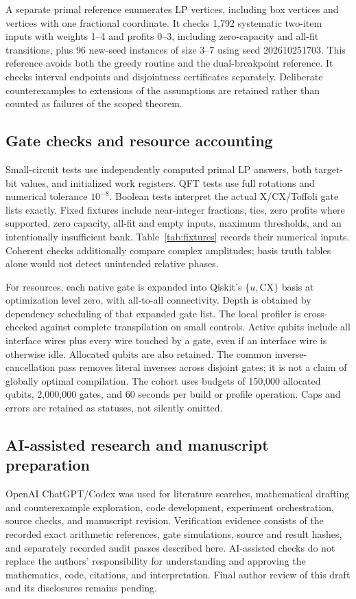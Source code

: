 \documentclass[referee,pdflatex,sn-mathphys-num]{sn-jnl}
\theoremstyle{thmstyleone}
\theoremstyle{thmstyletwo}
\begin{document}
A separate primal reference enumerates LP vertices, including box vertices and vertices with one fractional coordinate. It checks 1,792 systematic two-item inputs with weights 1--4 and profits 0--3, including zero-capacity and all-fit transitions, plus 96 new-seed instances of size 3--7 using seed 202610251703. This reference avoids both the greedy routine and the dual-breakpoint reference. It checks interval endpoints and disjointness certificates separately. Deliberate counterexamples to extensions of the assumptions are retained rather than counted as failures of the scoped theorem.

\subsection{Gate checks and resource accounting}
Small-circuit tests use independently computed primal LP answers, both target-bit values, and initialized work registers. QFT tests use full rotations and numerical tolerance $10^{-8}$. Boolean tests interpret the actual X/CX/Toffoli gate lists exactly. Fixed fixtures include near-integer fractions, ties, zero profits where supported, zero capacity, all-fit and empty inputs, maximum thresholds, and an intentionally insufficient bank. Table~\ref{tab:fixtures} records their numerical inputs. Coherent checks additionally compare complex amplitudes; basis truth tables alone would not detect unintended relative phases.

For resources, each native gate is expanded into Qiskit's $\{u,\mathrm{CX}\}$ basis at optimization level zero, with all-to-all connectivity. Depth is obtained by dependency scheduling of that expanded gate list. The local profiler is cross-checked against complete transpilation on small controls. Active qubits include all interface wires plus every wire touched by a gate, even if an interface wire is otherwise idle. Allocated qubits are also retained. The common inverse-cancellation pass removes literal inverses across disjoint gates; it is not a claim of globally optimal compilation. The cohort uses budgets of 150,000 allocated qubits, 2,000,000 gates, and 60 seconds per build or profile operation. Caps and errors are retained as statuses, not silently omitted.

\subsection{AI-assisted research and manuscript preparation}
OpenAI ChatGPT/Codex was used for literature searches, mathematical drafting and counterexample exploration, code development, experiment orchestration, source checks, and manuscript revision. Verification evidence consists of the recorded exact arithmetic references, gate simulations, source and result hashes, and separately recorded audit passes described here. AI-assisted checks do not replace the authors' responsibility for understanding and approving the mathematics, code, citations, and interpretation. Final author review of this draft and its disclosures remains pending.
\end{document}
